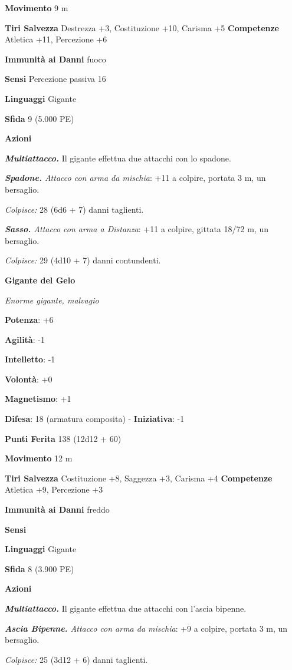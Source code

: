 \begin{multicols}{2}
\textbf{Movimento} 9 m

\textbf{Tiri Salvezza} Destrezza +3, Costituzione +10, Carisma +5
\textbf{Competenze} Atletica +11, Percezione +6

\textbf{Immunità ai Danni} fuoco

\textbf{Sensi} Percezione passiva 16

\textbf{Linguaggi} Gigante

\textbf{Sfida} 9 (5.000 PE)

\textbf{Azioni}

\emph{\textbf{Multiattacco.}} Il gigante effettua due attacchi con lo
spadone.

\emph{\textbf{Spadone.} Attacco con arma da mischia}: +11 a colpire,
portata 3 m, un bersaglio.

\emph{Colpisce:} 28 (6d6 + 7) danni taglienti.

\emph{\textbf{Sasso.} Attacco con arma a Distanza}: +11 a colpire,
gittata 18/72 m, un bersaglio.

\emph{Colpisce:} 29 (4d10 + 7) danni contundenti.

\textbf{Gigante del Gelo}

\emph{Enorme gigante, malvagio}

\textbf{Potenza}: +6

\textbf{Agilità}: -1

\textbf{Intelletto}: -1

\textbf{Volontà}: +0

\textbf{Magnetismo}: +1

\textbf{Difesa}: 18 (armatura composita) - \textbf{Iniziativa}: -1

\textbf{Punti Ferita} 138 (12d12 + 60)

\textbf{Movimento} 12 m

\textbf{Tiri Salvezza} Costituzione +8, Saggezza +3, Carisma +4
\textbf{Competenze} Atletica +9, Percezione +3

\textbf{Immunità ai Danni} freddo

\textbf{Sensi} 

\textbf{Linguaggi} Gigante

\textbf{Sfida} 8 (3.900 PE)

\textbf{Azioni}

\emph{\textbf{Multiattacco.}} Il gigante effettua due attacchi con
l'ascia bipenne.

\emph{\textbf{Ascia Bipenne.} Attacco con arma da mischia}: +9 a
colpire, portata 3 m, un bersaglio.

\emph{Colpisce:} 25 (3d12 + 6) danni taglienti.


\end{multicols}
